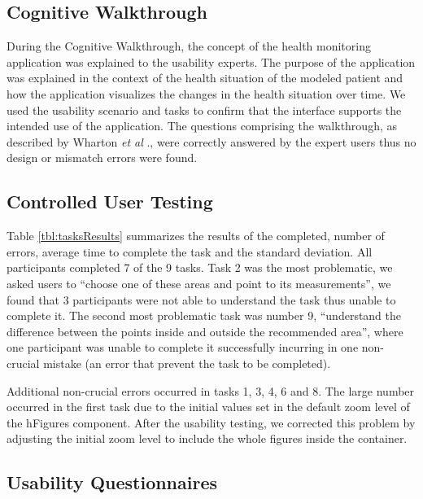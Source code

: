 \documentclass[twocolumn]{bmcart}%
\begin{document}
\subsection*{Cognitive Walkthrough}


During the Cognitive Walkthrough, the concept of the health monitoring application was explained to the usability experts. The purpose of the application was explained in the context of the health situation of the modeled patient and how the application visualizes the changes in the health situation over time. We used the usability scenario and tasks to confirm that the interface supports the intended use of the application. The questions comprising the walkthrough, as described by Wharton \textit{et al} \cite{wharton1994cognitive}., were correctly answered by the expert users thus no design or mismatch errors were found.

\subsection*{Controlled User Testing}

Table \ref{tbl:tasksResults} summarizes the results of the completed, number of errors, average time to complete the task and the standard deviation. All participants completed 7 of the 9 tasks. Task 2 was the most problematic, we asked users to ``choose one of these areas and point to its measurements'', we found that 3 participants were not able to understand the task thus unable to complete it. The second most problematic task was number 9, ``understand the difference between the points inside and outside the recommended area'', where one participant was unable to complete it successfully incurring in one non-crucial mistake (an error that prevent the task to be completed). 

Additional non-crucial errors occurred in tasks 1, 3, 4, 6 and 8. The large number occurred in the first task due to the initial values set in the default zoom level of the hFigures component. After the usability testing, we corrected this problem by adjusting the initial zoom level to include the whole figures inside the container.

\subsection*{Usability Questionnaires}
\end{document}
